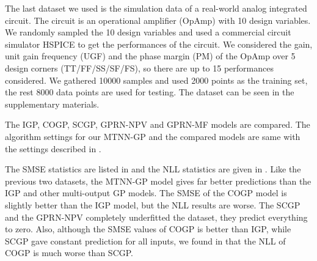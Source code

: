 The last dataset we used is the simulation data of a real-world analog integrated circuit. The circuit is an operational amplifier (OpAmp) with 10 design variables. We randomly sampled the 10 design variables and used a commercial circuit simulator HSPICE to get the performances of the circuit. We considered the gain, unit gain frequency (UGF) and the phase margin (PM) of the OpAmp over 5 design corners (TT/FF/SS/SF/FS), so there are up to 15 performances considered. We gathered 10000 samples and used 2000 points as the training set, the rest 8000 data points are used for testing. The dataset can be seen in the supplementary materials.


The IGP, COGP, SCGP, GPRN-NPV and GPRN-MF models are compared. The algorithm settings for our MTNN-GP and the compared models are same with the settings described in .


The SMSE statistics are listed in  and the NLL statistics are given in . Like the previous two datasets, the MTNN-GP model gives far better predictions than the IGP and other multi-output GP models. The SMSE of the COGP model is slightly better than the IGP model, but the NLL results are worse. The SCGP and the GPRN-NPV completely underfitted the dataset, they predict everything to zero. Also, although the SMSE values of COGP is better than IGP, while SCGP gave constant prediction for all inputs, we found in  that the NLL of COGP is much worse than SCGP.

